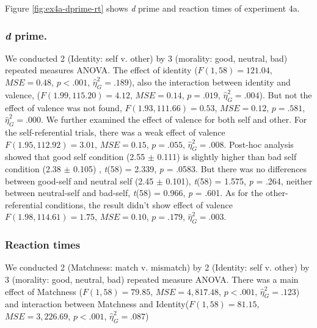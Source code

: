 \documentclass[
  english,
  man]{apa6}
\begin{document}
Figure \ref{fig:ex4a-dprime-rt} shows \emph{d} prime and reaction times of experiment 4a.

\hypertarget{d-prime.-1}{%
\subsubsection{\texorpdfstring{\emph{d} prime.}{d prime.}}\label{d-prime.-1}}

We conducted 2 (Identity: self v. other) by 3 (morality: good, neutral, bad) repeated measures ANOVA. The effect of identity (\(F(1, 58) = 121.04\), \(\mathit{MSE} = 0.48\), \(p < .001\), \(\hat{\eta}^2_G = .189\)), also the interaction between identity and valence, (\(F(1.99, 115.20) = 4.12\), \(\mathit{MSE} = 0.14\), \(p = .019\), \(\hat{\eta}^2_G = .004\)). But not the effect of valence was not found, \(F(1.93, 111.66) = 0.53\), \(\mathit{MSE} = 0.12\), \(p = .581\), \(\hat{\eta}^2_G = .000\). We further examined the effect of valence for both self and other. For the self-referential trials, there was a weak effect of valence \(F(1.95, 112.92) = 3.01\), \(\mathit{MSE} = 0.15\), \(p = .055\), \(\hat{\eta}^2_G = .008\). Post-hoc analysis showed that good self condition (2.55 \(\pm\) 0.111) is slightly higher than bad self condition (2.38 \(\pm\) 0.105) , \emph{t}(58) = 2.339, \emph{p} = .0583. But there was no differences between good-self and neutral self (2.45 \(\pm\) 0.101), \emph{t}(58) = 1.575, \emph{p} = .264, neither between neutral-self and bad-self, \emph{t}(58) = 0.966, \emph{p} = .601. As for the other-referential conditions, the result didn't show effect of valence \(F(1.98, 114.61) = 1.75\), \(\mathit{MSE} = 0.10\), \(p = .179\), \(\hat{\eta}^2_G = .003\).

\hypertarget{reaction-times}{%
\subsubsection{Reaction times}\label{reaction-times}}

We conducted 2 (Matchness: match v. mismatch) by 2 (Identity: self v. other) by 3 (morality: good, neutral, bad) repeated measure ANOVA. There was a main effect of Matchness (\(F(1, 58) = 79.85\), \(\mathit{MSE} = 4,817.48\), \(p < .001\), \(\hat{\eta}^2_G = .123\)) and interaction between Matchness and Identity(\(F(1, 58) = 81.15\), \(\mathit{MSE} = 3,226.69\), \(p < .001\), \(\hat{\eta}^2_G = .087\))
\end{document}
